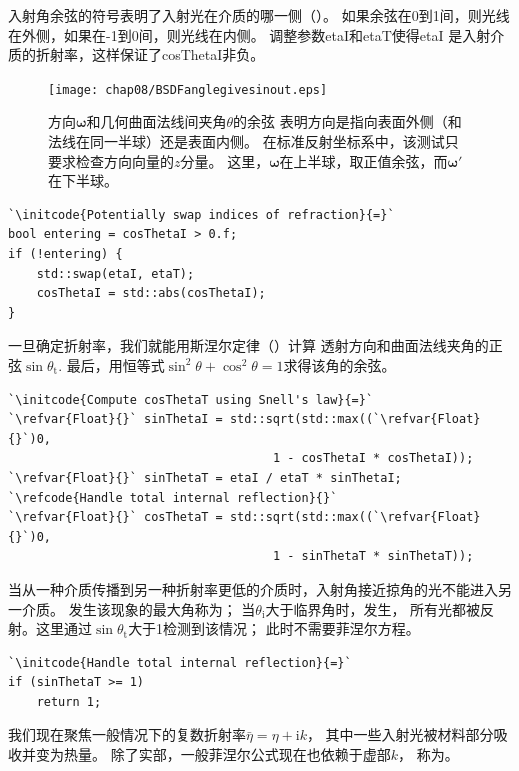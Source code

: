 入射角余弦的符号表明了入射光在介质的哪一侧（）。
如果余弦在0到1间，则光线在外侧，如果在-1到0间，则光线在内侧。
调整参数{\ttfamily etaI}和{\ttfamily etaT}使得{\ttfamily etaI}
是入射介质的折射率，这样保证了{\ttfamily cosThetaI}非负。

\begin{figure}[htbp]
    \centering
    \texttt{[image: chap08/BSDFanglegivesinout.eps]}
    \caption{方向$\bm\omega$和几何曲面法线间夹角$\theta$的余弦
        表明方向是指向表面外侧（和法线在同一半球）还是表面内侧。
        在标准反射坐标系中，该测试只要求检查方向向量的$z$分量。
        这里，$\bm\omega$在上半球，取正值余弦，而${\bm\omega}'$在下半球。}
    \label{fig:8.5}
\end{figure}

\begin{lstlisting}
`\initcode{Potentially swap indices of refraction}{=}`
bool entering = cosThetaI > 0.f;
if (!entering) {
    std::swap(etaI, etaT);
    cosThetaI = std::abs(cosThetaI);
}
\end{lstlisting}

一旦确定折射率，我们就能用斯涅尔定律（）计算
透射方向和曲面法线夹角的正弦$\sin\theta_{\mathrm{t}}$.
最后，用恒等式$\sin^2\theta+\cos^2\theta=1$求得该角的余弦。
\begin{lstlisting}
`\initcode{Compute cosThetaT using Snell's law}{=}`
`\refvar{Float}{}` sinThetaI = std::sqrt(std::max((`\refvar{Float}{}`)0,
                                     1 - cosThetaI * cosThetaI));
`\refvar{Float}{}` sinThetaT = etaI / etaT * sinThetaI;
`\refcode{Handle total internal reflection}{}`
`\refvar{Float}{}` cosThetaT = std::sqrt(std::max((`\refvar{Float}{}`)0,
                                     1 - sinThetaT * sinThetaT));
\end{lstlisting}

当从一种介质传播到另一种折射率更低的介质时，入射角接近掠角的光不能进入另一介质。
发生该现象的最大角称为；
当$\theta_{\mathrm{i}}$大于临界角时，发生，
所有光都被反射。这里通过$\sin\theta_{\mathrm{t}}$大于1检测到该情况；
此时不需要菲涅尔方程。
\begin{lstlisting}
`\initcode{Handle total internal reflection}{=}`
if (sinThetaT >= 1)
    return 1;
\end{lstlisting}

我们现在聚焦一般情况下的复数折射率$\bar{\eta}=\eta+\mathrm{i}k$，
其中一些入射光被材料部分吸收并变为热量。
除了实部，一般菲涅尔公式现在也依赖于虚部$k$，
称为。

